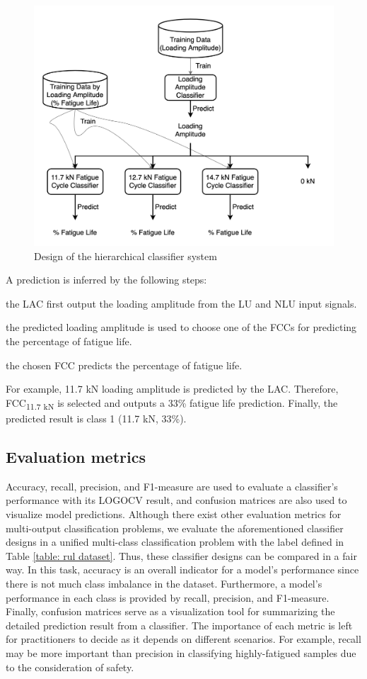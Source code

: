 \begin{figure}[tb]
    \centering
    \includegraphics[width=0.9\linewidth]{fig/hierarchical_classifier.png}
    \caption{Design of the hierarchical classifier system}
    \label{fig: hierarchical classifier}
\end{figure}


A prediction is inferred by the following steps: 
\begin{enumerate*}[label=(\alph*)]
    \item the LAC first output the loading amplitude from the LU and NLU input signals.
    \item the predicted loading amplitude is used to choose one of the FCCs for predicting the percentage of fatigue life.
    \item the chosen FCC predicts the percentage of fatigue life.
\end{enumerate*}
For example, 11.7 kN loading amplitude is predicted by the LAC. Therefore, FCC\textsubscript{11.7 kN} is selected and outputs a 33\% fatigue life prediction. Finally, the predicted result is class 1 (11.7 kN, 33\%).

\subsection{Evaluation metrics}
Accuracy, recall, precision, and F1-measure are used to evaluate a classifier's performance with its LOGOCV result, and confusion matrices are also used to visualize model predictions. Although there exist other evaluation metrics for multi-output classification problems, we evaluate the aforementioned classifier designs in a unified multi-class classification problem with the label defined in Table \ref{table: rul dataset}. Thus, these classifier designs can be compared in a fair way. In this task, accuracy is an overall indicator for a model's performance since there is not much class imbalance in the dataset. Furthermore, a model's performance in each class is provided by recall, precision, and F1-measure. Finally, confusion matrices serve as a visualization tool for summarizing the detailed prediction result from a classifier. The importance of each metric is left for practitioners to decide as it depends on different scenarios. For example, recall may be more important than precision in classifying highly-fatigued samples due to the consideration of safety.

